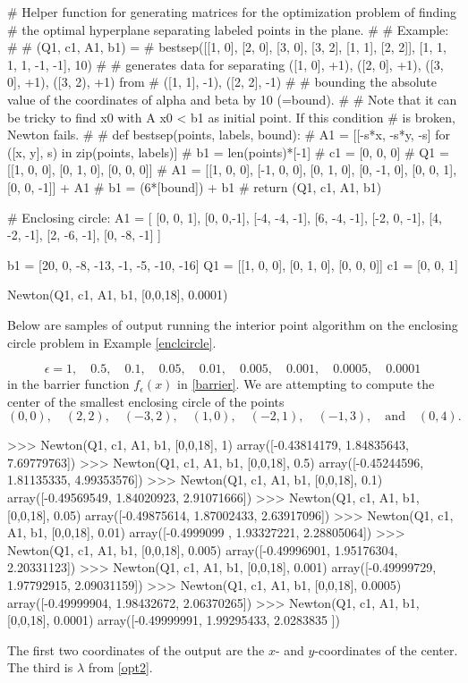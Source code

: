 \documentclass{article}
\begin{document}
\begin{sage}[python]
# Helper function for generating matrices for the optimization problem of finding
# the optimal hyperplane separating labeled points in the plane.
#
# Example:
#
# (Q1, c1, A1, b1) =
# bestsep([[1, 0], [2, 0], [3, 0], [3, 2],  [1, 1], [2, 2]], [1, 1, 1, 1, -1, -1], 10)
#
# generates data for separating ([1, 0], +1), ([2, 0], +1), ([3, 0], +1), ([3, 2), +1) from
# ([1, 1], -1), ([2, 2], -1)
#
# bounding the absolute value of the coordinates of alpha and beta by 10 (=bound).
#
# Note that it can be tricky to find x0 with A x0 < b1 as initial point. If this condition
# is broken, Newton fails.
#
# def bestsep(points, labels, bound):
#     A1 = [[-s*x, -s*y, -s] for ([x, y], s) in zip(points, labels)]
#     b1 = len(points)*[-1]
#     c1 = [0, 0, 0]
#     Q1 = [[1, 0, 0], [0, 1, 0], [0, 0, 0]]
#     A1 = [[1, 0, 0], [-1, 0, 0], [0, 1, 0], [0, -1, 0], [0, 0, 1], [0, 0, -1]] + A1
#     b1 = (6*[bound]) + b1
#     return (Q1, c1, A1, b1)
    


# Enclosing circle:
A1 = [
    [0, 0, 1],
    [0, 0,-1],
    [-4, -4, -1],
    [6, -4, -1],
    [-2, 0, -1],
    [4, -2, -1],
    [2, -6, -1],
    [0, -8, -1]
]

b1 = [20, 0, -8, -13, -1, -5, -10, -16]
Q1 = [[1, 0, 0], [0, 1, 0], [0, 0, 0]]
c1 = [0, 0, 1]
  
Newton(Q1, c1, A1, b1, [0,0,18], 0.0001)
\end{sage}


\begin{example}

  Below are samples of output running the interior point algorithm on the enclosing circle problem in Example \ref{enclcircle}.

  $$
  \epsilon = 1,\quad 0.5, \quad 0.1, \quad 0.05, \quad 0.01, \quad 0.005, \quad 0.001, \quad 0.0005, \quad 0.0001
  $$
  in the barrier function $f_\epsilon(x)$ in \eqref{barrier}. We are attempting to compute the center
  of the smallest enclosing circle of the points
  $$
  (0, 0), \quad (2,2), \quad (-3, 2), \quad (1, 0), \quad (-2, 1), \quad (-1, 3), \quad\text{and}\quad
  (0, 4).
  $$
\begin{code}
>>> Newton(Q1, c1, A1, b1, [0,0,18], 1)
array([-0.43814179,  1.84835643,  7.69779763])
>>> Newton(Q1, c1, A1, b1, [0,0,18], 0.5)
array([-0.45244596,  1.81135335,  4.99353576])
>>> Newton(Q1, c1, A1, b1, [0,0,18], 0.1)
array([-0.49569549,  1.84020923,  2.91071666])
>>> Newton(Q1, c1, A1, b1, [0,0,18], 0.05)
array([-0.49875614,  1.87002433,  2.63917096])
>>> Newton(Q1, c1, A1, b1, [0,0,18], 0.01)
array([-0.4999099 ,  1.93327221,  2.28805064])
>>> Newton(Q1, c1, A1, b1, [0,0,18], 0.005)
array([-0.49996901,  1.95176304,  2.20331123])
>>> Newton(Q1, c1, A1, b1, [0,0,18], 0.001)
array([-0.49999729,  1.97792915,  2.09031159])
>>> Newton(Q1, c1, A1, b1, [0,0,18], 0.0005)
array([-0.49999904,  1.98432672,  2.06370265])
>>> Newton(Q1, c1, A1, b1, [0,0,18], 0.0001)
array([-0.49999991,  1.99295433,  2.0283835 ])
\end{code}
The first two coordinates of the output are the $x$- and $y$-coordinates of the center. The third
is $\lambda$ from \eqref{opt2}. 
\end{example}
\end{document}
